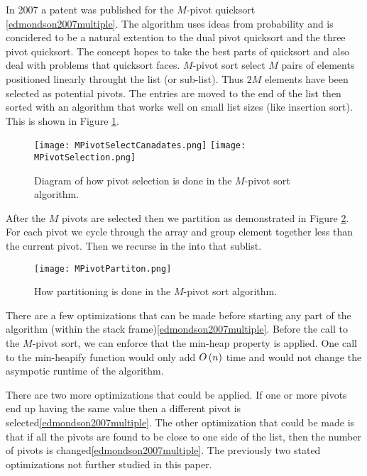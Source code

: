 		In 2007 a patent was published for the $M$-pivot quicksort \ref{edmondson2007multiple}. The algorithm uses ideas from probability and is concidered to be a natural extention to the dual pivot quicksort and the three pivot quicksort. The concept hopes to take the best parts of quicksort and also deal with problems that quicksort faces. $M$-pivot sort select $M$ pairs of elements positioned linearly throught the list (or sub-list).  Thus $2M$ elements have been selected as potential pivots. The entries are moved to the end of the list then sorted with an algorithm that works well on small list sizes (like insertion sort). This is shown in Figure \ref{fig:MPivotSelecton}.
		\begin{figure}[ht!]
			\begin{center}
				\texttt{[image: MPivotSelectCanadates.png]}
				\texttt{[image: MPivotSelection.png]}
				\caption{Diagram of how pivot selection is done in the $M$-pivot sort algorithm.}
				\label{fig:MPivotSelecton}
			\end{center}
		\end{figure}
		After the $M$ pivots are selected then we partition as demonstrated in Figure \ref{fig:MPivotPartition}. For each pivot we cycle through the array and group element together less than the current pivot. Then we recurse in the into that sublist.
		\begin{figure}[ht!]
			\begin{center}
				\texttt{[image: MPivotPartiton.png]}
				\caption{How partitioning is done in the $M$-pivot sort algorithm.}
				\label{fig:MPivotPartition}
			\end{center}
		\end{figure}
		There are a few optimizations that can be made before starting any part of the algorithm (within the stack frame)\ref{edmondson2007multiple}. Before the call to the $M$-pivot sort, we can enforce that the min-heap property is applied. One call to the min-heapify function would only add $O\left(n\right)$ time and would not change the asympotic runtime of the algorithm.
		
		There are two more optimizations that could be applied. If one or more pivots end up having the same value then a different pivot is selected\ref{edmondson2007multiple}. The other optimization that could be made is that if all the pivots are found to be close to one side of the list, then the number of pivots is changed\ref{edmondson2007multiple}. The previously two stated optimizations not further studied in this paper.

